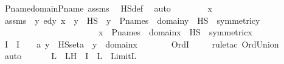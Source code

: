 \begin{isabellebody}
\ P{\isacharunderscore}{\kern0pt}name{\isacharunderscore}{\kern0pt}domain{\isacharunderscore}{\kern0pt}P{\isacharunderscore}{\kern0pt}name\ assms\ \isamarkupfalse%
\ HS{\isacharunderscore}{\kern0pt}def\ \isamarkupfalse%
\ auto\isanewline
\ \ \isamarkupfalse%
\isanewline
{}\isamarkupfalse%
\ \isanewline
\ \ \isamarkupfalse%
\ x\ \isamarkupfalse%
\ assms\ {\isacharcolon}{\kern0pt}\ {\isachardoublequoteopen}{\isacharparenleft}{\kern0pt}{\isasymAnd}y{\isachardot}{\kern0pt}\ ed{\isacharparenleft}{\kern0pt}y{\isacharcomma}{\kern0pt}\ x{\isacharparenright}{\kern0pt}\ {\isasymLongrightarrow}\ y\ {\isasymin}\ HS\ {\isasymlongleftrightarrow}\ y\ {\isasymin}\ P{\isacharunderscore}{\kern0pt}names\ {\isasymand}\ domain{\isacharparenleft}{\kern0pt}y{\isacharparenright}{\kern0pt}\ {\isasymsubseteq}\ HS\ {\isasymand}\ symmetric{\isacharparenleft}{\kern0pt}y{\isacharparenright}{\kern0pt}{\isacharparenright}{\kern0pt}{\isachardoublequoteclose}\ \isanewline
\ \ \ \ \ \ \ \ \ \ \ \ \ \ \ \ \ \ \ \ \ \ \ {\isachardoublequoteopen}x\ {\isasymin}\ P{\isacharunderscore}{\kern0pt}names\ {\isasymand}\ domain{\isacharparenleft}{\kern0pt}x{\isacharparenright}{\kern0pt}\ {\isasymsubseteq}\ HS\ {\isasymand}\ symmetric{\isacharparenleft}{\kern0pt}x{\isacharparenright}{\kern0pt}{\isachardoublequoteclose}\isanewline
\isanewline
\ \ \isamarkupfalse%
\ I\ \ {\isachardoublequoteopen}I\ {\isasymequiv}\ {\isacharbraceleft}{\kern0pt}\ {\isacharparenleft}{\kern0pt}{\isasymmu}\ a{\isachardot}{\kern0pt}\ y\ {\isasymin}\ HS{\isacharunderscore}{\kern0pt}set{\isacharparenleft}{\kern0pt}a{\isacharparenright}{\kern0pt}{\isacharparenright}{\kern0pt}\ {\isachardot}{\kern0pt}\ y\ {\isasymin}\ domain{\isacharparenleft}{\kern0pt}x{\isacharparenright}{\kern0pt}\ {\isacharbraceright}{\kern0pt}{\isachardoublequoteclose}\ \isanewline
\ \ \isamarkupfalse%
\ \isamarkupfalse%
\ {\isachardoublequoteopen}Ord{\isacharparenleft}{\kern0pt}{\isasymUnion}I{\isacharparenright}{\kern0pt}{\isachardoublequoteclose}\isanewline
\ \ \ \ \isamarkupfalse%
{\isacharparenleft}{\kern0pt}rule{\isacharunderscore}{\kern0pt}tac\ Ord{\isacharunderscore}{\kern0pt}Union{\isacharparenright}{\kern0pt}\ \isanewline
\ \ \ \ \isamarkupfalse%
\ auto\ \isanewline
\ \ \isamarkupfalse%
\ \isamarkupfalse%
\ L\ \ LH\ {\isacharcolon}{\kern0pt}\ {\isachardoublequoteopen}{\isacharparenleft}{\kern0pt}{\isasymUnion}I{\isacharparenright}{\kern0pt}\ {\isacharless}{\kern0pt}\ L{\isachardoublequoteclose}\ \ {\isachardoublequoteopen}Limit{\isacharparenleft}{\kern0pt}L{\isacharparenright}{\kern0pt}{\isachardoublequoteclose}\ \isanewline

\end{isabellebody}
